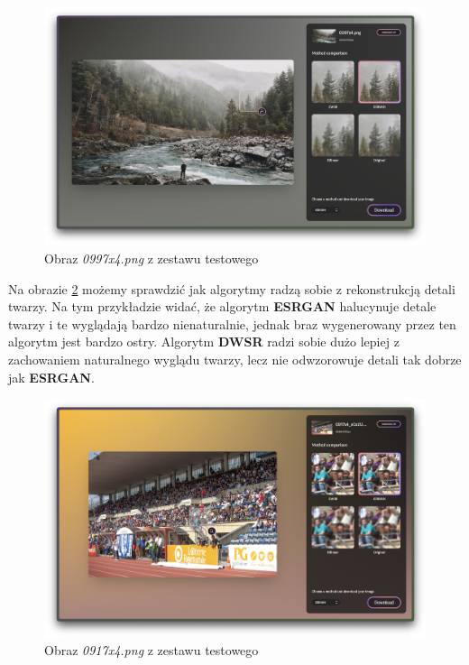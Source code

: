 \newpage
\begin{figure}[H]
    \centering
    \includegraphics[width=0.9\linewidth]{Rozdziały/05.Porownanie_algorytmow/Obrazy/Zrzut ekranu 2023-12-12 o 14.13.48.jpg}  
    \caption{Obraz \textit{0997x4.png} z zestawu testowego \cite{guo2017deep}}
    \label{fig:image100}
\end{figure}

Na obrazie \ref{fig:image101} możemy sprawdzić jak algorytmy radzą sobie z rekonstrukcją detali twarzy. Na tym przykładzie widać, że algorytm \textbf{ESRGAN} halucynuje detale twarzy i te wyglądają bardzo nienaturalnie, jednak braz wygenerowany przez ten algorytm jest bardzo ostry. Algorytm \textbf{DWSR} radzi sobie dużo lepiej z zachowaniem naturalnego wyglądu twarzy, lecz nie odwzorowuje detali tak dobrze jak \textbf{ESRGAN}.

\begin{figure}[ht]
    \centering
    \includegraphics[width=0.9\linewidth]{Rozdziały/05.Porownanie_algorytmow/Obrazy/Zrzut ekranu 2023-12-12 o 14.11.49.jpg}  
    \caption{Obraz \textit{0917x4.png} z zestawu testowego \cite{guo2017deep}}
    \label{fig:image101}
\end{figure}

